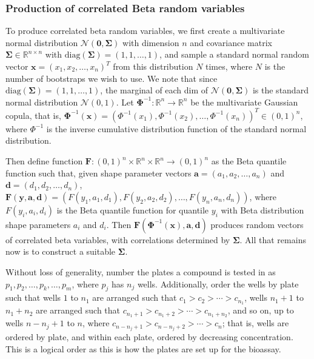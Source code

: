 \documentclass[11pt, letterpaper]{article}
\newcommand{\mbb}[1]{\mathbb{#1}}
\newcommand{\mc}[1]{\mathcal{#1}}
\begin{document}
\subsubsection{Production of correlated Beta random variables}\label{sect:sigma}
To produce correlated beta random variables, we first create a multivariate normal distribution $\mc N(\bm 0, \bm \Sigma)$ with dimension $n$ and covariance matrix $\bm \Sigma \in \mbb R^{n \times n}$ with $\text{diag} (\bm \Sigma) = (1, 1, \dots, 1)$, and sample a standard normal random vector $\bm x = (x_1, x_2, \dots, x_n)^T$ from this distribution $N$ times, where $N$ is the number of bootstraps we wish to use. We note that since $\text{diag} (\bm \Sigma) = (1, 1, \dots, 1)$, the marginal of each dim of $\mc N(\bm 0, \bm \Sigma)$ is the standard normal distribution $\mc N(0,1)$. Let $\bm \Phi^{-1} : \mbb R^n \to \mbb R^n$ be the multivariate Gaussian copula, that is, $\bm \Phi^{-1}(\bm x) = \left( \Phi^{-1}(x_1),  \Phi^{-1}(x_2), \dots,  \Phi^{-1}(x_n)\right)^T\in (0,1)^n$, where $ \Phi^{-1}$ is the inverse cumulative distribution function of the standard normal distribution. 

Then define function $\textbf{F}: (0,1)^n \times \mbb R^n \times \mbb R^n \to (0,1)^n$ as the Beta quantile function such that, given shape parameter vectors $\bm a = (a_1, a_2, \dots, a_n)$ and $\bm d = (d_1, d_2, \dots, d_n)$, $\textbf{F}(\bm y, \bm a, \bm d) = \left(F(y_1, a_1, d_1), F(y_2, a_2, d_2), \dots, F(y_n, a_n, d_n) \right)$, where $F(y_i, a_i, d_i)$ is the Beta quantile function for quantile $y_i$ with Beta distribution shape parameters $a_i$ and $d_i$. Then $\bm F\left(\bm \Phi^{-1} (\bm x), \bm a, \bm d \right)$ produces random vectors of correlated beta variables, with correlations determined by $\bm  \Sigma$. All that remains now is to construct a suitable $\bm  \Sigma$. 

Without loss of generality, number the plates a compound is tested in as $p_1, p_2,\dots, p_k, \dots, p_m$, where $p_j$ has $n_j$ wells. Additionally, order the wells by plate such that wells $1$ to $n_1$ are arranged such that $c_1 > c_2 > \cdots > c_{n_1}$, wells $n_1+1$ to $n_1+n_2$ are arranged such that $c_{n_1+1} > c_{n_1+2} > \cdots > c_{n_1 +n_2}$, and so on, up to wells $n - n_j + 1$ to $n$, where $c_{n-n_j+1} > c_{n - n_j+2} > \cdots > c_{n}$; that is, wells are ordered by plate, and within each plate, ordered by decreasing concentration. This is a logical order as this is how the plates are set up for the bioassay.
\end{document}
